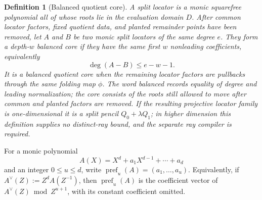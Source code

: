 \documentclass[12pt,a4paper]{amsart}
\numberwithin{equation}{section}
\newtheorem{definition}[definition]{Definition}
\theoremstyle{remark}
\begin{document}
\begin{definition}[Balanced quotient core]
\label{def:balanced-quotient-core}
A \emph{split locator} is a monic squarefree polynomial all of whose roots
lie in the evaluation domain \(D\).
After common locator factors, fixed quotient data, and planted remainder
points have been removed, let \(A\) and \(B\) be two monic split
locators of the same degree \(e\).  They form a
\emph{depth-\(w\) balanced core} if they have the same first \(w\)
nonleading coefficients, equivalently
\[
                         \deg(A-B)\le e-w-1.
\]
It is a \emph{balanced quotient core} when the remaining locator factors
are pullbacks through the same folding map \(\phi\).  The word
\emph{balanced} records equality of degree and leading normalization;
the \emph{core} consists of the roots still allowed to move after common
and planted factors are removed.  If the resulting projective locator
family is one-dimensional it is a split pencil
\(Q_0+\lambda Q_1\); in higher dimension this definition supplies no
distinct-ray bound, and the separate ray compiler is required.
\end{definition}

For a monic polynomial
\[
 A(X)=X^d+a_1X^{d-1}+\cdots+a_d
\]
and an integer $0\le u\le d$, write
\(\operatorname{pref}_u(A)=(a_1,\ldots,a_u)\).  Equivalently, if
\(A^\vee(Z):=Z^dA(Z^{-1})\), then
\(\operatorname{pref}_u(A)\) is the coefficient vector of
\(A^\vee(Z)\bmod Z^{u+1}\), with its constant coefficient omitted.
\end{document}

